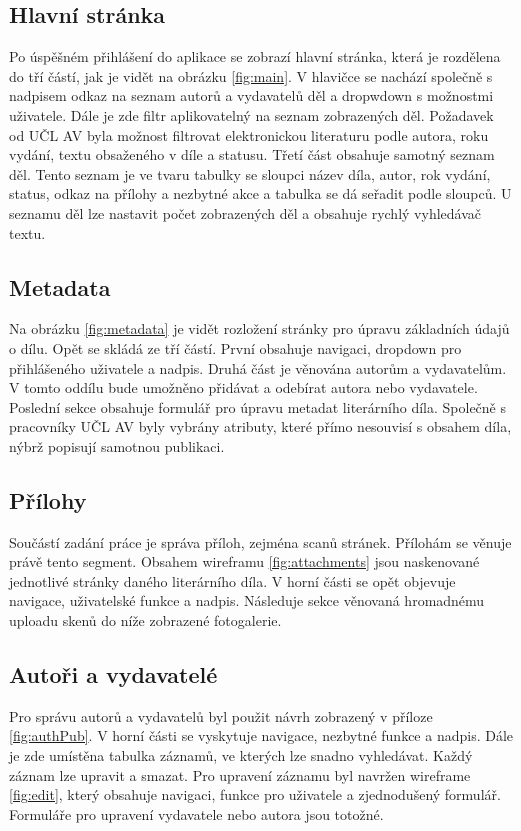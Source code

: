         \subsection{Hlavní stránka}
            Po úspěšném přihlášení do aplikace se zobrazí hlavní stránka, která je rozdělena do tří částí, jak je vidět na obrázku \ref{fig:main}. V hlavičce se nachází společně s nadpisem odkaz na seznam autorů a vydavatelů děl a dropwdown s možnostmi uživatele. Dále je zde filtr aplikovatelný na seznam zobrazených děl. Požadavek od UČL AV byla možnost filtrovat elektronickou literaturu podle autora, roku vydání, textu obsaženého v díle a statusu. Třetí část obsahuje samotný seznam děl. Tento seznam je ve tvaru tabulky se sloupci název díla, autor, rok vydání, status, odkaz na přílohy a nezbytné akce a tabulka se dá seřadit podle sloupců. U seznamu děl lze nastavit počet zobrazených děl a obsahuje rychlý vyhledávač textu.

        \subsection{Metadata}
            Na obrázku \ref{fig:metadata} je vidět rozložení stránky pro úpravu základních údajů o dílu. Opět se skládá ze tří částí. První obsahuje navigaci, dropdown pro přihlášeného uživatele a nadpis. Druhá část je věnována autorům a vydavatelům. V tomto oddílu bude umožněno přidávat a odebírat autora nebo vydavatele. Poslední sekce obsahuje formulář pro úpravu metadat literárního díla. Společně s pracovníky UČL AV byly vybrány atributy, které přímo nesouvisí s obsahem díla, nýbrž popisují samotnou publikaci. 
        
        \subsection{Přílohy}
            Součástí zadání práce je správa příloh, zejména scanů stránek. Přílohám se věnuje právě tento segment. Obsahem wireframu \ref{fig:attachments} jsou naskenované jednotlivé stránky daného literárního díla. V horní části se opět objevuje navigace, uživatelské funkce a nadpis. Následuje sekce věnovaná hromadnému uploadu skenů do níže zobrazené fotogalerie.
            
        \subsection{Autoři a vydavatelé}
            Pro správu autorů a vydavatelů byl použit návrh zobrazený v příloze \ref{fig:authPub}. V horní části se vyskytuje navigace, nezbytné funkce a nadpis. Dále je zde umístěna tabulka záznamů, ve kterých lze snadno vyhledávat. Každý záznam lze upravit a smazat. Pro upravení záznamu byl navržen wireframe \ref{fig:edit}, který obsahuje navigaci, funkce pro uživatele a zjednodušený formulář. Formuláře pro upravení vydavatele nebo autora jsou totožné.
            
